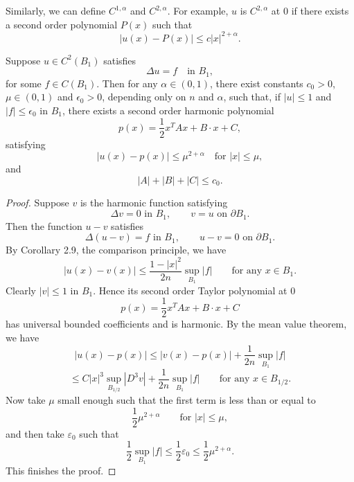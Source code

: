 Similarly, we can define $C^{1,\alpha}$ and $C^{2,\alpha}$. For example, $u$ is $C^{2,\alpha}$ at $0$ if there exists a second order polynomial $P(x)$ such that
\[
|u(x) - P(x)| \le c|x|^{2+\alpha}.
\]

\begin{lemma}\label{hanlin:maxprin-lemma-2-19}
Suppose $u \in C^2(B_1)$ satisfies
\[
\Delta u = f \quad \text{in } B_1,
\]
for some $f \in C(B_1)$. Then for any $\alpha \in (0,1)$, there exist constants $c_0 > 0$, $\mu \in (0,1)$ and $\epsilon_0 > 0$, depending only on $n$ and $\alpha$, such that, if $|u| \le 1$ and $|f| \le \epsilon_0$ in $B_1$, there exists a second order harmonic polynomial
\[
p(x) = \frac{1}{2}x^T A x + B \cdot x + C,
\]
satisfying
\[
|u(x) - p(x)| \le \mu^{2+\alpha} \quad \text{for } |x| \le \mu,
\]
and
\[
|A| + |B| + |C| \le c_0.
\]
\end{lemma}
\begin{proof}
\sketch
Suppose $v$ is the harmonic function satisfying
\[
\Delta v = 0 \text{ in } B_1,
\qquad
v = u \text{ on } \partial B_1.
\]
Then the function $u-v$ satisfies
\[
\Delta (u-v) = f \text{ in } B_1,
\qquad
u-v = 0 \text{ on } \partial B_1.
\]
By Corollary 2.9, the comparison principle, we have
\[
|u(x)-v(x)| \le \frac{1-|x|^2}{2n}\sup_{B_1}|f| \qquad \text{for any } x \in B_1.
\]
Clearly $|v| \le 1$ in $B_1$. Hence its second order Taylor polynomial at $0$
\[
p(x)=\frac12 x^T A x + B \cdot x + C
\]
has universal bounded coefficients and is harmonic. By the mean value theorem,
we have
\[
|u(x)-p(x)| \le |v(x)-p(x)|+\frac1{2n}\sup_{B_1}|f|
\]
\[
\le C|x|^3\sup_{B_{1/2}}|D^3v|+\frac1{2n}\sup_{B_1}|f|
\qquad \text{for any } x \in B_{1/2}.
\]
Now take $\mu$ small enough such that the first term is less than or equal to
\[
\frac12\mu^{2+\alpha} \qquad \text{for } |x|\le \mu,
\]
and then take $\varepsilon_0$ such that
\[
\frac12\sup_{B_1}|f| \le \frac12\varepsilon_0 \le \frac12\mu^{2+\alpha}.
\]
This finishes the proof.
\end{proof}

